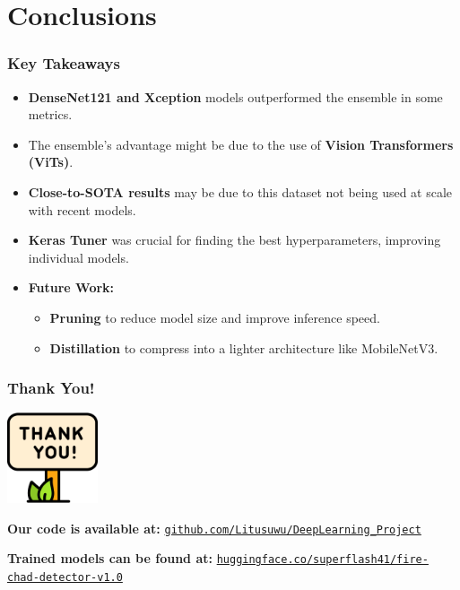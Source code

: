 \section{Conclusions}
\label{sec:conclusions}

\begin{frame}
    \frametitle{Key Takeaways}
    \begin{itemize}
        \item \textbf{DenseNet121 and Xception} models outperformed the ensemble in some metrics.
        \item The ensemble's advantage might be due to the use of \textbf{Vision Transformers (ViTs)}.
        \item \textbf{Close-to-SOTA results} may be due to this dataset not being used at scale with recent models.
        \item \textbf{Keras Tuner} was crucial for finding the best hyperparameters, improving individual models.
        \item \textbf{Future Work:}
        \begin{itemize}
            \item \textbf{Pruning} to reduce model size and improve inference speed.
            \item \textbf{Distillation} to compress into a lighter architecture like MobileNetV3.
        \end{itemize}
    \end{itemize}
\end{frame}

\begin{frame}
    \frametitle{Thank You!}

    \centering
    \includegraphics[width=0.2\textwidth]{images/thanks}

    \vspace{0.5cm}

    \textbf{Our code is available at:}
    \href{https://github.com/Litusuwu/DeepLearning_Project}{\texttt{github.com/Litusuwu/DeepLearning\_Project}}

    \vspace{0.5cm}

    \textbf{Trained models can be found at:}
    \href{https://huggingface.co/superflash41/fire-chad-detector-v1.0}{\texttt{huggingface.co/superflash41/fire-chad-detector-v1.0}}
\end{frame}